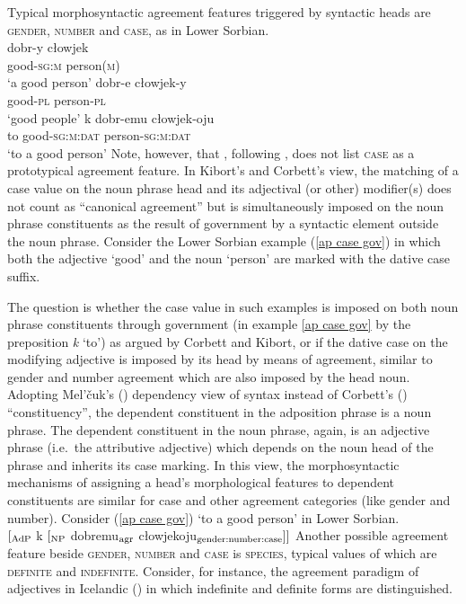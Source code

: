 Typical morphosyntactic agreement features triggered by syntactic heads are \textsc{gender, number} and \textsc{case}, as in Lower Sorbian.
\ea \label{sorbian agr}
\\
\ea
\gll	dobr-y cłowjek\\
	good-\textsc{sg:m} person(\textsc{m})\\
\glt	‘a good person’
\ex
\gll	dobr-e cłowjek-y\\
	good-\textsc{pl} person-\textsc{pl}\\
\glt	‘good people’
\ex \label{ap case gov}
\gll	k dobr-emu cłowjek-oju\\
	to good-\textsc{sg:m:dat} person-\textsc{sg:m:dat}\\
\glt	‘to a good person’
\z
\z 
Note, however, that \textcite{kibort2010a}, following \citealt[133–135]{corbett2006}, does not list \textsc{case} as a prototypical agreement feature. In Kibort's and Corbett's view, the matching of a case value on the noun phrase head and its adjectival (or other) modifier(s) does not count as “canonical agreement” but is simultaneously imposed on the noun phrase constituents as the result of government by a syntactic element outside the noun phrase. Consider the Lower Sorbian example (\ref{ap case gov}) in which both the adjective ‘good’ and the noun ‘person’ are marked with the dative case suffix.

The question is whether the case value in such examples is imposed on both noun phrase constituents through government (in example \ref{ap case gov} by the preposition \textit{k} ‘to’) as argued by Corbett and Kibort, or if the dative case on the modifying adjective is imposed by its head by means of agreement, similar to gender and number agreement which are also imposed by the head noun. Adopting Mel'čuk's (\citeyear[329, 337]{melcuk1993}) dependency view of syntax instead of Corbett's (\citeyear[133]{corbett2006}) “constituency”, the dependent constituent in the adposition phrase is a noun phrase. The dependent constituent in the noun phrase, again, is an adjective phrase (i.e.~the attributive adjective) which depends on the noun head of the phrase and inherits its case marking. In this view, the morphosyntactic mechanisms of assigning a head's morphological features to dependent constituents are similar for case and other agreement categories (like gender and number). Consider (\ref{ap case gov}) ‘to a good person’ in Lower Sorbian.
\ea
{}\\
$[_{\rm AdP}$ k $[_{\rm NP}$ dobremu$_{\rm agr}$ cłowjekoju$_{\rm gender:number:case} ] ]$
\z
Another possible agreement feature beside \textsc{gender, number} and \textsc{case} is \textsc{species}, typical values of which are \textsc{definite} and \textsc{indefinite}. Consider, for instance, the agreement paradigm of adjectives in Icelandic () in which indefinite and definite forms are distinguished.

